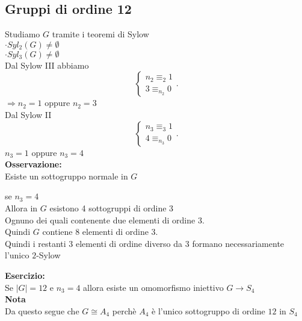 \documentclass[12px]{article}
\begin{document}
	\subsection{Gruppi di ordine 12}
	Studiamo $G$ tramite i teoremi di Sylow\\
	$\cdot Syl_2(G)\neq \emptyset$\\
	 $\cdot Syl_3(G)\neq\emptyset$ \\
	 Dal Sylow III abbiamo
	 \[
	 \begin{cases}
	 	n_2 \equiv_2 1\\
		3\equiv_{n_2} 0
	 \end{cases}
	 .\] 
	 $ \Rightarrow n_2= 1$ oppure $n_2 = 3$\\
	 Dal Sylow II
	  \[
		  \begin{cases}
		  	
	 n_3\equiv_3 1\\
	 4\equiv_{n_3} 0
		  \end{cases}
	 .\] 
	 $n_3 = 1$ oppure $n_3 = 4$\\
	  \textbf{Osservazione:}\\
	  Esiste un sottogruppo normale in $G$
	  \begin{dimo}
	  	se $n_3 = 4$\\
		Allora in  $G$ esistono 4 sottogruppi di ordine 3\\
		Ognuno dei quali contenente due elementi di ordine 3.\\
		Quindi $G$ contiene 8 elementi di ordine 3.\\
		Quindi i restanti 3 elementi di ordine diverso da 3 formano necessariamente l'unico $2$-Sylow
	  \end{dimo}
	  \textbf{Esercizio:}\\
	  Se $|G| = 12$ e  $n_3 = 4$ allora esiste un omomorfismo iniettivo  $G \rightarrow S_4$\\
	  \textbf{Nota}\\
	  Da questo segue che $G\cong A_4$ perchè $A_4$ è l'unico sottogruppo di ordine $12$ in $S_4$
\end{document}
